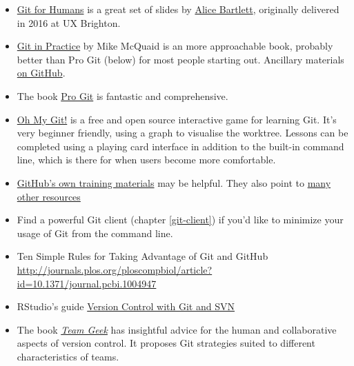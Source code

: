 \documentclass[
]{book}
\begin{document}
\begin{itemize}
\item
  \href{https://speakerdeck.com/alicebartlett/git-for-humans}{Git for Humans} is a great set of slides by \href{https://alicebartlett.co.uk}{Alice Bartlett}, originally delivered in 2016 at UX Brighton.
\item
  \href{https://www.manning.com/books/git-in-practice}{Git in Practice} by Mike McQuaid is an more approachable book, probably better than Pro Git (below) for most people starting out. Ancillary materials \href{https://github.com/MikeMcQuaid/GitInPractice}{on GitHub}.
\item
  The book \href{http://git-scm.com/book}{Pro Git} is fantastic and comprehensive.
\item
  \href{https://ohmygit.org/}{Oh My Git!} is a free and open source interactive game for learning Git. It's very beginner friendly, using a graph to visualise the worktree. Lessons can be completed using a playing card interface in addition to the built-in command line, which is there for when users become more comfortable.
\item
  \href{https://training.github.com}{GitHub's own training materials} may be helpful. They also point to \href{https://help.github.com/articles/what-are-other-good-resources-for-learning-git-and-github}{many other resources}
\item
  Find a powerful Git client (chapter \ref{git-client}) if you'd like to minimize your usage of Git from the command line.
\item
  Ten Simple Rules for Taking Advantage of Git and GitHub \url{http://journals.plos.org/ploscompbiol/article?id=10.1371/journal.pcbi.1004947}
\item
  RStudio's guide \href{https://support.rstudio.com/hc/en-us/articles/200532077-Version-Control-with-Git-and-SVN}{Version Control with Git and SVN}
\item
  The book \emph{\href{http://shop.oreilly.com/product/0636920018025.do}{Team Geek}} has insightful advice for the human and collaborative aspects of version control. It proposes Git strategies suited to different characteristics of teams.
\end{itemize}
\end{document}
